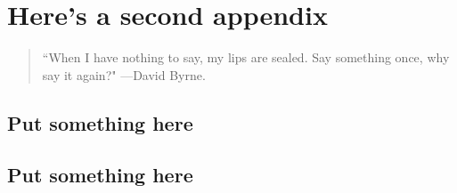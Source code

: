%
%
\chapter{Here's a second appendix}\label{ch:appb}

\begin{quote}
\small ``When I have nothing to say, my lips are sealed.  Say something once,
why say it again?"
---David Byrne.
\end{quote}

\section{Put something here}

\section{Put something here}
